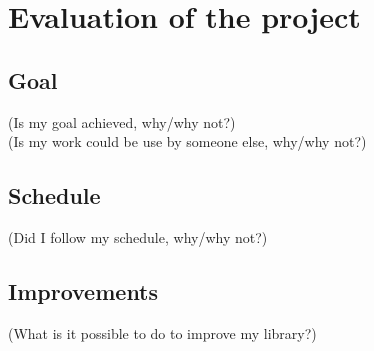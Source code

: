 \chapter{Evaluation of the project}


\section{Goal}

(Is my goal achieved, why/why not?)\\
(Is my work could be use by someone else, why/why not?)


\section{Schedule}

(Did I follow my schedule, why/why not?)


\section{Improvements}

(What is it possible to do to improve my library?)



\clearpage
